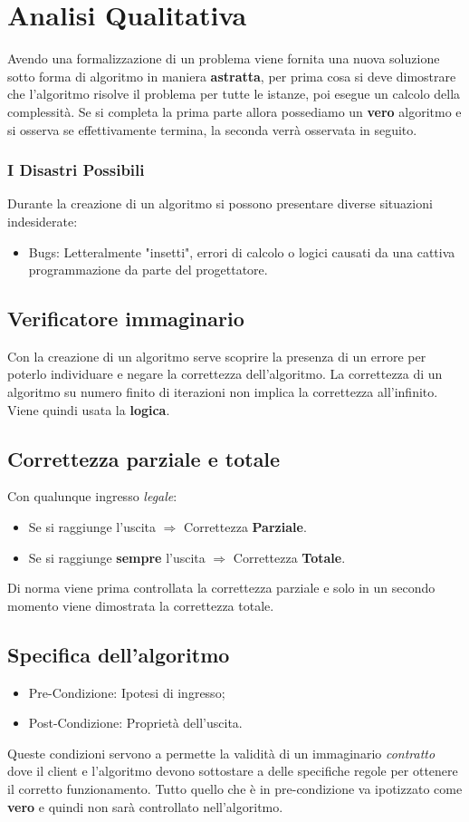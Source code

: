 \documentclass[twocolumn]{article}
\begin{document}
\section{Analisi Qualitativa}
Avendo una formalizzazione di un problema viene fornita una nuova soluzione sotto forma di algoritmo in maniera \textbf{astratta}, per prima cosa si deve dimostrare che l'algoritmo risolve il problema per tutte le istanze, poi esegue un calcolo della complessità. Se si completa la prima parte allora possediamo un \textbf{vero} algoritmo e si osserva se effettivamente termina, la seconda verrà osservata in seguito. 
\subsubsection{I Disastri Possibili}
Durante la creazione di un algoritmo si possono presentare diverse situazioni indesiderate: \begin{itemize}
    \item Bugs: Letteralmente "insetti", errori di calcolo o logici causati da una cattiva programmazione da parte del progettatore.
\end{itemize}
\subsection{Verificatore immaginario}
Con la creazione di un algoritmo serve scoprire la presenza di un errore per poterlo individuare e negare la correttezza dell'algoritmo. La correttezza di un algoritmo su numero finito di iterazioni non implica la correttezza all'infinito. Viene quindi usata la \textbf{logica}.
\subsection{Correttezza parziale e totale}
Con qualunque ingresso \textit{legale}:
\begin{itemize}
    \item Se si raggiunge l'uscita $\Rightarrow$ Correttezza \textbf{Parziale}.
    \item Se si raggiunge \textbf{sempre} l'uscita $\Rightarrow$ Correttezza \textbf{Totale}.
\end{itemize}
Di norma viene prima controllata la correttezza parziale e solo in un secondo momento viene dimostrata la correttezza totale.
\subsection{Specifica dell'algoritmo}
\begin{itemize}
    \item Pre-Condizione: Ipotesi di ingresso;
    \item Post-Condizione: Proprietà dell'uscita.
\end{itemize}
Queste condizioni servono a permette la validità di un immaginario \textit{contratto} dove il client e l'algoritmo devono sottostare a delle specifiche regole per ottenere il corretto funzionamento. Tutto quello che è in pre-condizione va ipotizzato come \textbf{vero} e quindi non sarà controllato nell'algoritmo.
\end{document}

